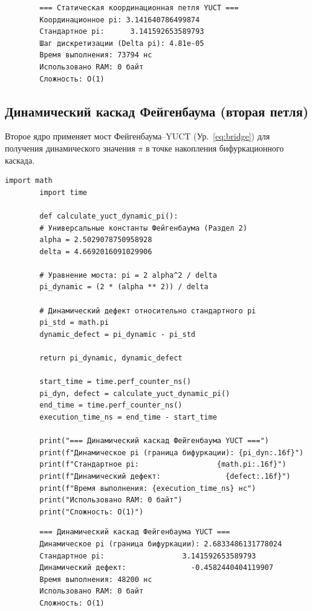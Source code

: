\documentclass[12pt,a4paper]{article}
\begin{document}
	\begin{verbatim}
		=== Статическая координационная петля YUCT ===
		Координационное pi: 3.141640786499874
		Стандартное pi:      3.141592653589793
		Шаг дискретизации (Delta pi): 4.81e-05
		Время выполнения: 73794 нс
		Использовано RAM: 0 байт
		Сложность: O(1)
	\end{verbatim}
	
	\subsection{Динамический каскад Фейгенбаума (вторая петля)}
	Второе ядро применяет мост Фейгенбаума–YUCT (Ур.~\ref{eq:bridge}) для получения динамического значения $\pi$ в точке накопления бифуркационного каскада.
	
	\begin{lstlisting}[caption={Ядро YUCT для динамического числа $\pi$ Фейгенбаума.}]
		import math
		import time
		
		def calculate_yuct_dynamic_pi():
		# Универсальные константы Фейгенбаума (Раздел 2)
		alpha = 2.5029078750958928
		delta = 4.6692016091029906
		
		# Уравнение моста: pi = 2 alpha^2 / delta
		pi_dynamic = (2 * (alpha ** 2)) / delta
		
		# Динамический дефект относительно стандартного pi
		pi_std = math.pi
		dynamic_defect = pi_dynamic - pi_std
		
		return pi_dynamic, dynamic_defect
		
		start_time = time.perf_counter_ns()
		pi_dyn, defect = calculate_yuct_dynamic_pi()
		end_time = time.perf_counter_ns()
		execution_time_ns = end_time - start_time
		
		print("=== Динамический каскад Фейгенбаума YUCT ===")
		print(f"Динамическое pi (граница бифуркации): {pi_dyn:.16f}")
		print(f"Стандартное pi:                  {math.pi:.16f}")
		print(f"Динамический дефект:               {defect:.16f}")
		print(f"Время выполнения: {execution_time_ns} нс")
		print("Использовано RAM: 0 байт")
		print("Сложность: O(1)")
	\end{lstlisting}
	
	\begin{verbatim}
		=== Динамический каскад Фейгенбаума YUCT ===
		Динамическое pi (граница бифуркации): 2.6833486131778024
		Стандартное pi:                  3.141592653589793
		Динамический дефект:               -0.4582440404119907
		Время выполнения: 48200 нс
		Использовано RAM: 0 байт
		Сложность: O(1)
	\end{verbatim}
	
\end{document}
